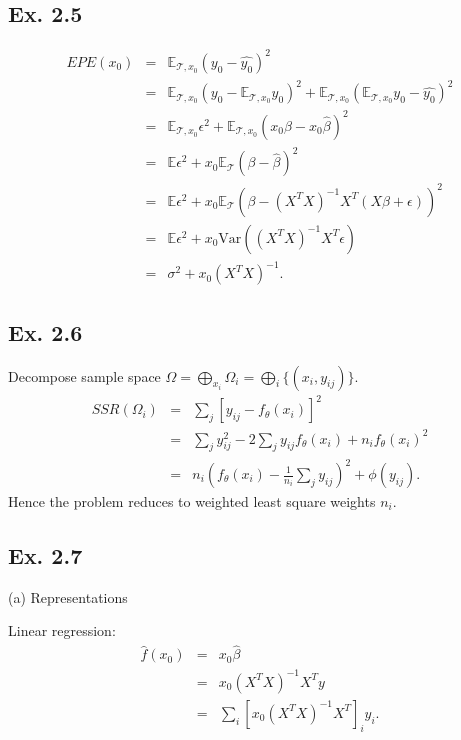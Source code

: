 \subsection*{Ex. 2.5}
\begin{eqnarray*}
	EPE(x_0) &=& \mathbb{E}_{\mathcal{T}, x_0}(y_0 - \hat{y_0})^2 \\
	&=& \mathbb{E}_{\mathcal{T}, x_0}(y_0 - \mathbb{E}_{\mathcal{T}, x_0}y_0)^2 + \mathbb{E}_{\mathcal{T}, x_0}(\mathbb{E}_{\mathcal{T}, x_0}y_0- \hat{y_0})^2 \\
	&=& \mathbb{E}_{\mathcal{T}, x_0}\epsilon^2 + \mathbb{E}_{\mathcal{T}, x_0}(x_0\beta - x_0\hat{\beta})^2 \\
	&=& \mathbb{E}\epsilon^2 +  x_0\mathbb{E}_{\mathcal{T}}(\beta - \hat{\beta})^2 \\
	&=& \mathbb{E}\epsilon^2 +  x_0\mathbb{E}_{\mathcal{T}}\left(\beta - (X^TX)^{-1}X^{T}(X\beta + \epsilon)\right)^2 \\
	&=& \mathbb{E}\epsilon^2 +  x_0\mbox{Var}\left((X^TX)^{-1}X^{T}\epsilon\right) \\
	&=& \sigma^2 +  x_0 (X^TX)^{-1}.
\end{eqnarray*}

\subsection*{Ex. 2.6}
Decompose sample space $\Omega=\bigoplus_{x_i}\Omega_i=\bigoplus_{i}\{(x_i, y_{ij})\}.$
\begin{eqnarray*}
	SSR(\Omega_i) &=& \sum_{j}[y_{ij} - f_{\theta}(x_{i})]^2 \\
	&=&\sum_{j}y_{ij}^2-2 \sum_{j}y_{ij}f_{\theta}(x_{i}) + n_if_{\theta}(x_{i})^2\\
	&=&n_{i}\left(f_{\theta}(x_{i}) - \frac{1}{n_{i}}\sum_{j}y_{ij}\right)^2 + \phi(y_{ij}).
\end{eqnarray*}
Hence the problem reduces to weighted least square weights $n_{i}$.

\subsection*{Ex. 2.7}
(a) Representations

Linear regression:
\begin{eqnarray*}
	\hat{f}(x_0)&=&x_0\hat{\beta} \\
	&=& x_0 (X^{T}X)^{-1} X^{T}y \\
	&=& \sum_{i} [x_0 (X^{T}X)^{-1} X^{T}]_{i}y_{i}.
\end{eqnarray*}

